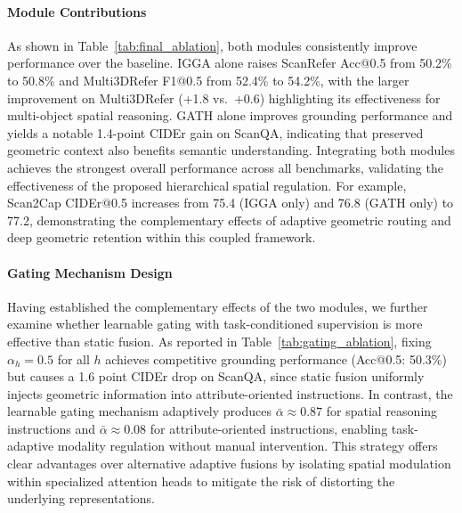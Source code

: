 \documentclass[lettersize,journal]{IEEEtran}
\begin{document}
\paragraph*{Module Contributions} As shown in Table~\ref{tab:final_ablation}, both modules consistently improve performance over the baseline. IGGA alone raises ScanRefer Acc@0.5 from 50.2\% to 50.8\% and Multi3DRefer F1@0.5 from 52.4\% to 54.2\%, with the larger improvement on Multi3DRefer (+1.8 vs.\ +0.6) highlighting its effectiveness for multi-object spatial reasoning. GATH alone improves grounding performance and yields a notable 1.4-point CIDEr gain on ScanQA, indicating that preserved geometric context also benefits semantic understanding. Integrating both modules achieves the strongest overall performance across all benchmarks, {validating the effectiveness of the proposed hierarchical spatial regulation}. For example, Scan2Cap CIDEr@0.5 increases from 75.4 (IGGA only) and 76.8 (GATH only) to 77.2, demonstrating the complementary effects of adaptive {geometric} routing and deep geometric retention {within this coupled framework}.

\paragraph*{Gating Mechanism Design}
\label{sec:igga_ablation}
Having established the complementary effects of the two modules, we further examine whether learnable gating with task-conditioned supervision is more effective than static fusion. As reported in Table~\ref{tab:gating_ablation}, fixing $\alpha_h = 0.5$ for all $h$ achieves competitive grounding performance (Acc@0.5: 50.3\%) but causes a 1.6 point CIDEr drop on ScanQA, since static fusion uniformly injects geometric information into attribute-oriented instructions. In contrast, the learnable gating mechanism adaptively produces $\bar{\alpha} \approx 0.87$ for spatial reasoning instructions and $\bar{\alpha} \approx 0.08$ for attribute-oriented instructions, enabling task-adaptive modality regulation without manual intervention. This strategy offers clear advantages over alternative adaptive fusions by isolating spatial modulation within specialized attention heads to mitigate the risk of distorting the underlying representations.
\end{document}

